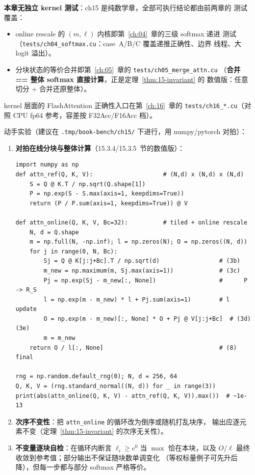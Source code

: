 \textbf{本章无独立 kernel 测试}：ch15 是纯数学章，全部可执行结论都由前两章的
测试覆盖：
\begin{itemize}
  \item online rescale 的 $(m, \ell)$ 内核即第~\ref{ch:04}~章的三级 softmax 递进
        测试（\texttt{tests/\allowbreak{}ch04\_\allowbreak{}softmax.\allowbreak{}cu}：case~A/B/C 覆盖递推正确性、边界
        线程、大 logit 溢出）。
  \item 分块状态的等价合并即第~\ref{ch:05}~章的 \texttt{tests/\allowbreak{}ch05\_\allowbreak{}merge\_\allowbreak{}attn.\allowbreak{}cu}
        （\textbf{合并 == 整体 softmax 直接计算}，正是定理~\ref{thm:15-invariant} 的
        数值版：任意切分 + 合并还原整体）。
\end{itemize}
kernel 层面的 FlashAttention 正确性入口在第~\ref{ch:16}~章的
\texttt{tests/\allowbreak{}ch16\_\allowbreak{}*.\allowbreak{}cu}（对照 CPU fp64 参考，容差按 F32Acc/F16Acc 档）。

动手实验（建议在 \texttt{.\allowbreak{}tmp/\allowbreak{}book-bench/\allowbreak{}ch15/\allowbreak{}} 下进行，用 numpy/pytorch 对拍）：

\begin{enumerate}[itemsep=0pt,topsep=2pt]
  \item \textbf{对拍在线分块与整体计算}（15.3.4/15.3.5~节的数值版）：
\begin{lstlisting}
import numpy as np
def attn_ref(Q, K, V):                    # (N,d) x (N,d) x (N,d)
    S = Q @ K.T / np.sqrt(Q.shape[1])
    P = np.exp(S - S.max(axis=1, keepdims=True))
    return (P / P.sum(axis=1, keepdims=True)) @ V

def attn_online(Q, K, V, Bc=32):          # tiled + online rescale
    N, d = Q.shape
    m = np.full(N, -np.inf); l = np.zeros(N); O = np.zeros((N, d))
    for j in range(0, N, Bc):
        Sj = Q @ K[j:j+Bc].T / np.sqrt(d)                 # (3b)
        m_new = np.maximum(m, Sj.max(axis=1))             # (3c)
        Pj = np.exp(Sj - m_new[:, None])                  #      P -> R_S
        l = np.exp(m - m_new) * l + Pj.sum(axis=1)        # l update
        O = np.exp(m - m_new)[:, None] * O + Pj @ V[j:j+Bc]  # (3d)(3e)
        m = m_new
    return O / l[:, None]                                 # (8) final

rng = np.random.default_rng(0); N, d = 256, 64
Q, K, V = (rng.standard_normal((N, d)) for _ in range(3))
print(abs(attn_online(Q, K, V) - attn_ref(Q, K, V)).max())  # ~1e-13
\end{lstlisting}
  \item \textbf{次序不变性}：把 \texttt{attn\_online} 的循环改为倒序或随机打乱块序，
        输出应逐元素不变（定理~\ref{thm:15-invariant} 的次序无关性）。
  \item \textbf{不变量逐块自检}：在循环内断言 $\ell_i \ge e^{0}$ 当
        $\max$ 恰在本块，以及 $O/\ell$ 最终收敛到参考值；部分输出不保证随块数单调变化
        （等权标量例子可先升后降），但每一步都与部分 softmax 严格等价。
\end{enumerate}

